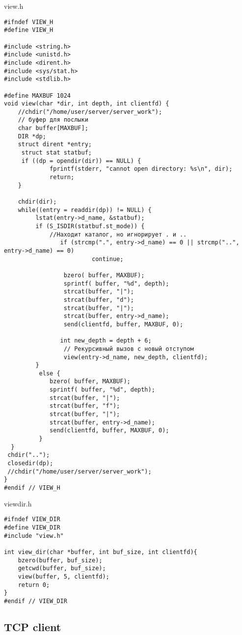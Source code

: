 \documentclass[12pt,a4paper]{report}
\begin{document}
view.h
\begin{lstlisting}
#ifndef VIEW_H
#define VIEW_H

#include <string.h>
#include <unistd.h>
#include <dirent.h>
#include <sys/stat.h>
#include <stdlib.h>

#define MAXBUF 1024
void view(char *dir, int depth, int clientfd) {
    //chdir("/home/user/server/server_work");
    // буфер для послыки
    char buffer[MAXBUF];
    DIR *dp;
    struct dirent *entry;
     struct stat statbuf;
     if ((dp = opendir(dir)) == NULL) {
             fprintf(stderr, "cannot open directory: %s\n", dir);
             return;
    }

    chdir(dir);
    while((entry = readdir(dp)) != NULL) {
         lstat(entry->d_name, &statbuf);
         if (S_ISDIR(statbuf.st_mode)) {
             //Находит каталог, но игнорирует . и ..
                if (strcmp(".", entry->d_name) == 0 || strcmp("..", entry->d_name) == 0)
                         continue;

                 bzero( buffer, MAXBUF);
                 sprintf( buffer, "%d", depth);
                 strcat(buffer, "|");
                 strcat(buffer, "d");
                 strcat(buffer, "|");
                 strcat(buffer, entry->d_name);
                 send(clientfd, buffer, MAXBUF, 0);

                int new_depth = depth + 6;
                 // Рекурсивный вызов с новый отступом
                 view(entry->d_name, new_depth, clientfd);
         }
          else {
             bzero( buffer, MAXBUF);
             sprintf( buffer, "%d", depth);
             strcat(buffer, "|");
             strcat(buffer, "f");
             strcat(buffer, "|");
             strcat(buffer, entry->d_name);
             send(clientfd, buffer, MAXBUF, 0);
          }
  }
 chdir("..");
 closedir(dp);
 //chdir("/home/user/server/server_work");
}
#endif // VIEW_H
\end{lstlisting}

viewdir.h\\
\begin{lstlisting}
#ifndef VIEW_DIR
#define VIEW_DIR
#include "view.h"

int view_dir(char *buffer, int buf_size, int clientfd){
    bzero(buffer, buf_size);
    getcwd(buffer, buf_size);
    view(buffer, 5, clientfd);
    return 0;
}
#endif // VIEW_DIR
\end{lstlisting}


\subsection*{TCP client}
\end{document}
